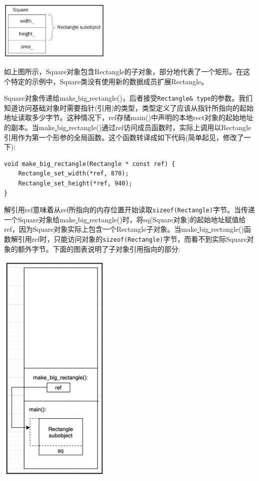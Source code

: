 \begin{center}
	\includegraphics[width=0.4\textwidth]{content/Section-1/Chapter-3/15}
\end{center}

如上图所示，Square对象包含Rectangle的子对象，部分地代表了一个矩形。在这个特定的示例中，Square类没有使用新的数据成员扩展Rectangle。 \par
Square对象传递给make\underline{ }big\underline{ }rectangle()，后者接受\texttt{Rectangle\& type}的参数。我们知道访问基础对象时需要指针(引用)的类型，类型定义了应该从指针所指向的起始地址读取多少字节。这种情况下，ref存储main()中声明的本地rect对象的起始地址的副本。当make\underline{ }big\underline{ }rectangle()通过ref访问成员函数时，实际上调用以Rectangle引用作为第一个形参的全局函数。这个函数转译成如下代码(简单起见，修改了一下): \par

\begin{lstlisting}[caption={}]
void make_big_rectangle(Rectangle * const ref) {
	Rectangle_set_width(*ref, 870);
	Rectangle_set_height(*ref, 940);
}
\end{lstlisting}

解引用ref意味着从ref所指向的内存位置开始读取\texttt{sizeof(Rectangle)}字节。当传递一个Square对象给make\underline{ }big\underline{ }rectangle()时，将sq(Square对象)的起始地址赋值给ref，因为Square对象实际上包含一个Rectangle子对象。当make\underline{ }big\underline{ }rectangle()函数解引用ref时，只能访问对象的\texttt{sizeof(Rectangle)}字节，而看不到实际Square对象的额外字节。下面的图表说明了子对象引用指向的部分: \par

\begin{center}
	\includegraphics[width=0.4\textwidth]{content/Section-1/Chapter-3/16}
\end{center}

